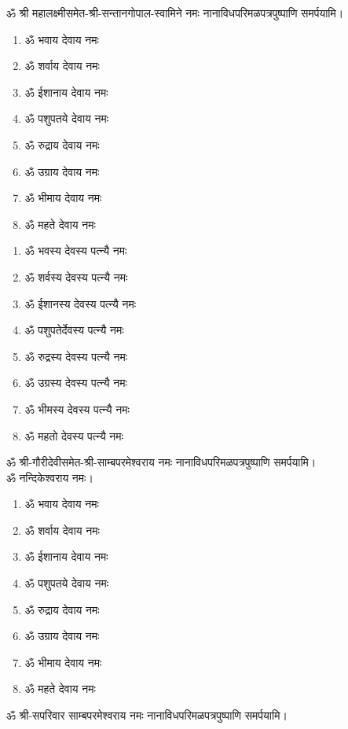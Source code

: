 \begin{center}
ॐ श्री महालक्ष्मीसमेत-श्री-सन्तानगोपाल-स्वामिने नमः नानाविधपरिमळपत्रपुष्पाणि समर्पयामि। \medskip

\clearpage
{}

\vspace{-1em}
\begin{multicols}{2}
\begin{enumerate}
\item ॐ भवाय देवाय नमः
\item ॐ शर्वाय देवाय नमः
\item ॐ ईशानाय देवाय नमः
\item ॐ पशुपतये देवाय नमः
\item ॐ रुद्राय देवाय नमः
\item ॐ उग्राय देवाय नमः
\item ॐ भीमाय देवाय नमः
\item ॐ महते देवाय नमः
\end{enumerate}
\end{multicols}
\vspace{-0.5em}
\begin{enumerate}
\item ॐ भवस्य देवस्य पत्न्यै नमः
\item ॐ शर्वस्य देवस्य पत्न्यै नमः
\item ॐ ईशानस्य देवस्य पत्न्यै नमः
\item ॐ पशुपतेर्देवस्य पत्न्यै नमः
\item ॐ रुद्रस्य देवस्य पत्न्यै नमः
\item ॐ उग्रस्य देवस्य पत्न्यै नमः
\item ॐ भीमस्य देवस्य पत्न्यै नमः
\item ॐ महतो देवस्य पत्न्यै नमः
\end{enumerate}

ॐ श्री-गौरीदेवीसमेत-श्री-साम्बपरमेश्वराय नमः नानाविधपरिमळपत्रपुष्पाणि समर्पयामि। \\
ॐ नन्दिकेश्वराय नमः।

\vspace{-1em}
\begin{multicols}{2}
\begin{enumerate}
\item ॐ भवाय देवाय नमः
\item ॐ शर्वाय देवाय नमः
\item ॐ ईशानाय देवाय नमः
\item ॐ पशुपतये देवाय नमः
\item ॐ रुद्राय देवाय नमः
\item ॐ उग्राय देवाय नमः
\item ॐ भीमाय देवाय नमः
\item ॐ महते देवाय नमः
\end{enumerate}
\end{multicols}
\vspace{-1em}
ॐ श्री-सपरिवार साम्बपरमेश्वराय नमः नानाविधपरिमळपत्रपुष्पाणि समर्पयामि। \medskip


\end{center}
